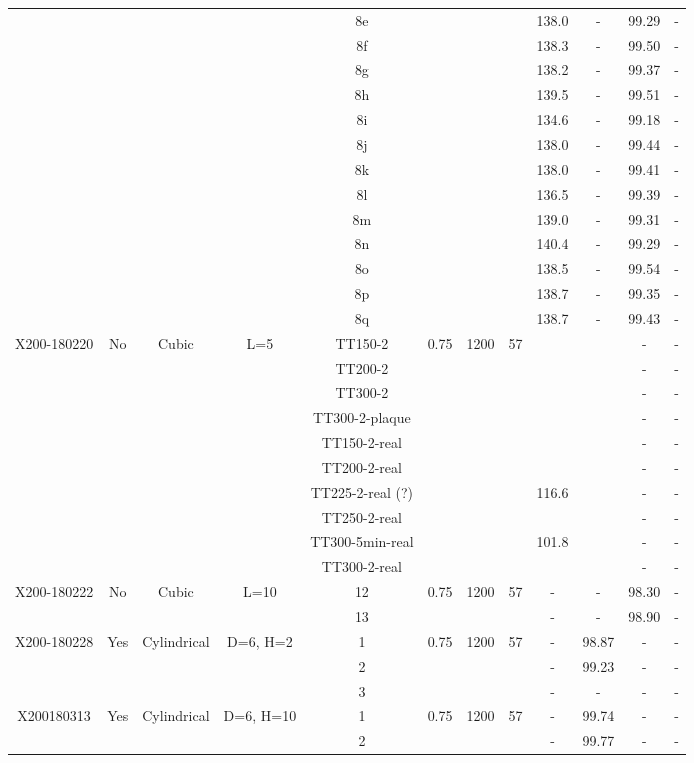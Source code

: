 \begin{center}
\begin{landscape}
\begin{savenotes}
\begin{longtable}{@{\extracolsep{\fill}}*{12}{|c}|@{}}
  & & & & 8e & & & &138.0 &- &99.29 &-\\
  & & & & 8f & & & &138.3 & -&99.50 &-\\
  & & & & 8g & & & &138.2 & -&99.37 &-\\
  & & & & 8h & & & &139.5 & -&99.51 &-\\
  & & & & 8i & & & &134.6 &- &99.18 &-\\
  & & & & 8j & & & &138.0 & -&99.44 &-\\
  & & & & 8k & & & &138.0 &- &99.41 &-\\  
  & & & & 8l & & & &136.5 & -&99.39 &-\\
  & & & & 8m & & & &139.0 & -&99.31 &-\\
  & & & & 8n & & & &140.4 &- &99.29 &-\\
  & & & & 8o & & & &138.5 &- &99.54 &-\\     
  & & & & 8p & & & &138.7 & -&99.35 &-\\
  & & & & 8q & & & &138.7 & -&99.43 &-\\        
\hline  
  X200-180220 & No & Cubic & L=5 & TT150-2 & 0.75 & 1200 & 57 & & & -&-\\
  & &  & & TT200-2 &  & & & & & -&-\\
  & &  & & TT300-2 &  & & & & &- &-\\
  & &  & & TT300-2-plaque &  & & & & &- &-\\
  & &  & & TT150-2-real &  & & & & &- &-\\
  & &  & & TT200-2-real &  & & & & &- &-\\
  & &  & & TT225-2-real (?) &  & & &116.6 & &- &-\\
  & &  & & TT250-2-real &  & & & & &- &-\\
  & &  & & TT300-5min-real &  & & &101.8 & & -&-\\  
  & &  & & TT300-2-real &  & & & & & - &-\\
\hline  
  X200-180222 & No & Cubic & L=10 &12& 0.75 & 1200 & 57 & - &- &98.30 &-\\
  & &  & &13 &  & & &- &- &98.90 &-\\
\hline  
  X200-180228  & Yes & Cylindrical & D=6, H=2 &1 & 0.75 & 1200 &57 &- &98.87 &- &-\\
  & &  &  & 2&  & & &- &99.23 &- &-\\
  & &  &  & 3 &  & & &- &- &- &-\\
\hline  
  X200180313 & Yes & Cylindrical & D=6, H=10&1& 0.75 & 1200 &57 &- &99.74 &- &-\\
    & &    & &2 & & & &- &99.77 &- &- \\

\end{longtable}
\end{savenotes}
\end{landscape}
\end{center}
